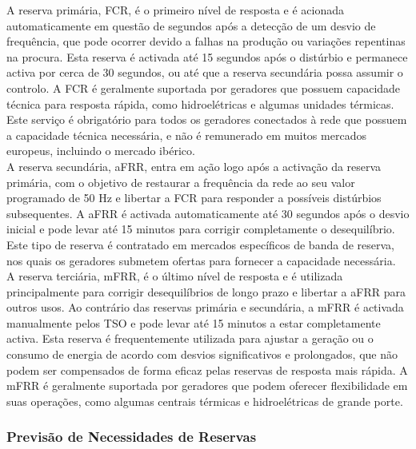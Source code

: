 A reserva primária, \gls{FCR}, é o primeiro nível de resposta e é acionada automaticamente em questão de segundos após a detecção de um desvio de frequência, que pode ocorrer devido a falhas na produção ou variações repentinas na procura. Esta reserva é activada até 15 segundos após o distúrbio e permanece activa por cerca de 30 segundos, ou até que a reserva secundária possa assumir o controlo. A \gls{FCR} é geralmente suportada por geradores que possuem capacidade técnica para resposta rápida, como hidroelétricas e algumas unidades térmicas. Este serviço é obrigatório para todos os geradores conectados à rede que possuem a capacidade técnica necessária, e não é remunerado em muitos mercados europeus, incluindo o mercado ibérico.\\
A reserva secundária, \gls{aFRR}, entra em ação logo após a activação da reserva primária, com o objetivo de restaurar a frequência da rede ao seu valor programado de 50 Hz e libertar a \gls{FCR} para responder a possíveis distúrbios subsequentes. A \gls{aFRR} é activada automaticamente até 30 segundos após o desvio inicial e pode levar até 15 minutos para corrigir completamente o desequilíbrio. Este tipo de reserva é contratado em mercados específicos de banda de reserva, nos quais os geradores submetem ofertas para fornecer a capacidade necessária.\\
A reserva terciária, \gls{mFRR}, é o último nível de resposta e é utilizada principalmente para corrigir desequilíbrios de longo prazo e libertar a \gls{aFRR} para outros usos. Ao contrário das reservas primária e secundária, a \gls{mFRR} é activada manualmente pelos \gls{TSO} e pode levar até 15 minutos a estar completamente activa. Esta reserva é frequentemente utilizada para ajustar a geração ou o consumo de energia de acordo com desvios significativos e prolongados, que não podem ser compensados de forma eficaz pelas reservas de resposta mais rápida. A \gls{mFRR} é geralmente suportada por geradores que podem oferecer flexibilidade em suas operações, como algumas centrais térmicas e hidroelétricas de grande porte.\\

\subsubsection{Previsão de Necessidades de Reservas \label{se:pred_impact_vres}}

